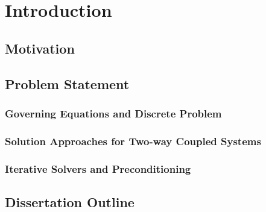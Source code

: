 \chapter{Introduction}
\label{ch:introduction}

\section{Motivation}

\section{Problem Statement}

\subsection{Governing Equations and Discrete Problem}

\subsection{Solution Approaches for Two-way Coupled Systems}

\subsection{Iterative Solvers and Preconditioning}

\section{Dissertation Outline}